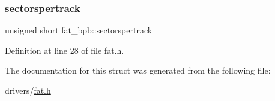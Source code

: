 \subsubsection{\texorpdfstring{sectorspertrack}{sectorspertrack}}
{\footnotesize\ttfamily unsigned short fat\+\_\+bpb\+::sectorspertrack}



Definition at line 28 of file fat.\+h.



The documentation for this struct was generated from the following file\+:\begin{DoxyCompactItemize}
\item 
drivers/\hyperlink{a00002}{fat.\+h}\end{DoxyCompactItemize}

